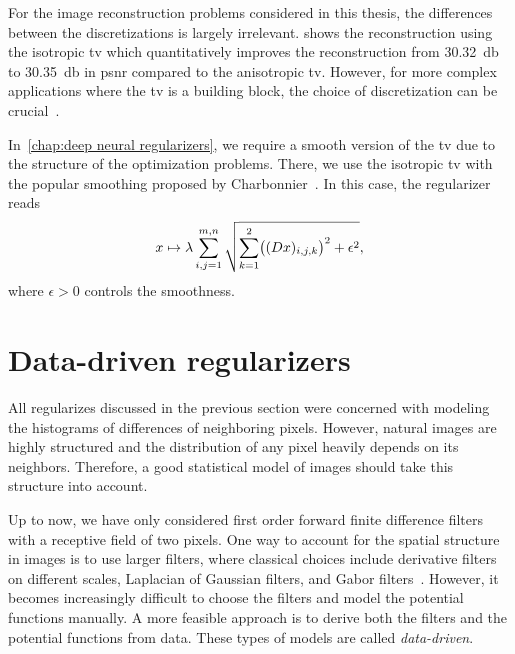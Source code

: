 
For the image reconstruction problems considered in this thesis, the differences between the discretizations is largely irrelevant.
 shows the reconstruction using the isotropic \gls{tv} which quantitatively improves the reconstruction from \qty{30.32}{\decibel} to \qty{30.35}{\decibel} in \gls{psnr} compared to the anisotropic \gls{tv}.
However, for more complex applications where the \gls{tv} is a building block, the choice of discretization can be crucial~\cite{chambolle_total_2018}.

In~\cref{chap:deep neural regularizers}, we require a smooth version of the \gls{tv} due to the structure of the optimization problems.
There, we use the isotropic \gls{tv} with the popular smoothing proposed by Charbonnier~\cite{charbonnier_deterministic_1994}.
In this case, the regularizer reads
\begin{equation}
	x \mapsto \lambda \sum_{i,j=\num{1}}^{m,n} \sqrt{\sum_{k=\num{1}}^{\num{2}} \bigl((D x)_{i,j,k}\bigr)^{\num{2}} + \epsilon^{\num{2}}},
\end{equation}
where \( \epsilon > \num{0} \) controls the smoothness.
\section{Data-driven regularizers}
All regularizes discussed in the previous section were concerned with modeling the histograms of differences of neighboring pixels.
However, natural images are highly structured and the distribution of any pixel heavily depends on its neighbors.
Therefore, a good statistical model of images should take this structure into account.

Up to now, we have only considered first order forward finite difference filters with a receptive field of two pixels.
One way to account for the spatial structure in images is to use larger filters, where classical choices include derivative filters on different scales, Laplacian of Gaussian filters, and Gabor filters~\cite{zhu_prior_1997,zhu_filters_1998}.
However, it becomes increasingly difficult to choose the filters and model the potential functions manually.
A more feasible approach is to derive both the filters and the potential functions from data.
These types of models are called \emph{data-driven}.

